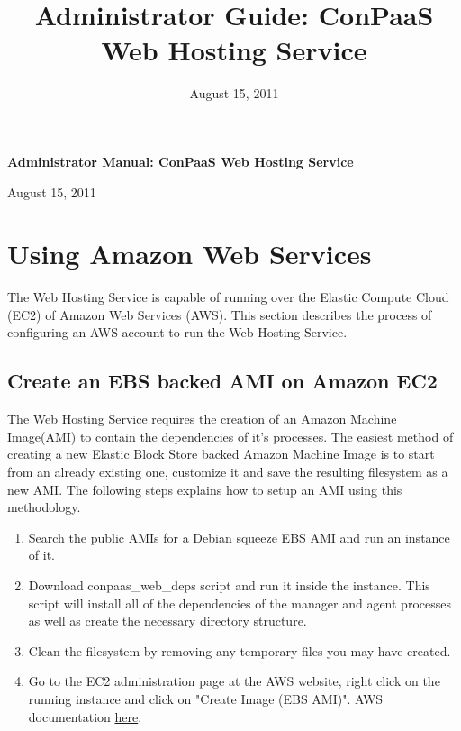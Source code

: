 \documentclass[12pt]{article}
\begin{document}
\title{Administrator Guide: ConPaaS Web Hosting Service}
\date{August 15, 2011}
\thispagestyle{empty}

\begin{center}
\begingroup
\fontsize{20pt}{20pt}\selectfont
\textbf{Administrator Manual: ConPaaS \linebreak \linebreak Web Hosting Service} \linebreak
\endgroup

\begingroup
\fontsize{16pt}{16pt}\selectfont
August 15, 2011
\endgroup
\end{center}

\section{Using Amazon Web Services}
The Web Hosting Service is capable of running over the Elastic Compute Cloud
(EC2) of Amazon Web Services (AWS). This section describes the process of
configuring an AWS account to run the Web Hosting Service.

\subsection{Create an EBS backed AMI on Amazon EC2}
The Web Hosting Service requires the creation of an Amazon Machine Image(AMI)
to contain the dependencies of it's processes.
The easiest method of creating a new Elastic Block Store backed Amazon Machine
Image is to start from an already existing one, customize it and save the
resulting filesystem as a new AMI. The following steps explains how to setup an
AMI using this methodology.

\begin{enumerate}
\item Search the public AMIs for a Debian squeeze EBS AMI and run an instance
      of it.
\item Download conpaas\_web\_deps script and run it inside the instance.
      This script will install all of the dependencies of the manager and
      agent processes as well as create the necessary directory structure.
\item Clean the filesystem by removing any temporary files you may have
      created.
\item Go to the EC2 administration page at the AWS website, right click on the
      running instance and click on "Create Image (EBS AMI)".
      AWS documentation \href{http://docs.amazonwebservices.com/AWSEC2/latest/UserGuide/index.html?Tutorial_CreateImage.html}{here}.
\end{enumerate}
\end{document}
